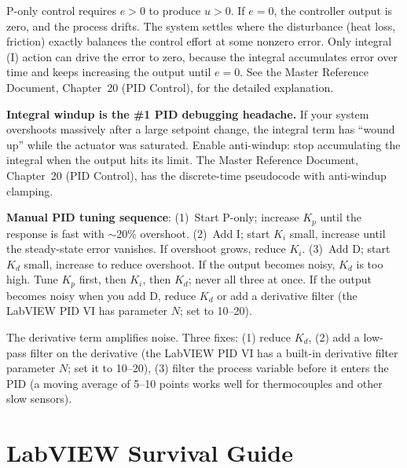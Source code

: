 \documentclass[11pt,letterpaper]{article}
\begin{document}
\begin{faqbox}
P-only control requires $e > 0$ to produce $u > 0$. If $e = 0$, the controller output is zero, and the process drifts. The system settles where the disturbance (heat loss, friction) exactly balances the control effort at some nonzero error. Only integral (I) action can drive the error to zero, because the integral accumulates error over time and keeps increasing the output until $e = 0$. See the Master Reference Document, Chapter~20 (PID Control), for the detailed explanation.
\end{faqbox}

\begin{warnbox}
\textbf{Integral windup is the \#1 PID debugging headache.} If your system overshoots massively after a large setpoint change, the integral term has ``wound up'' while the actuator was saturated. Enable anti-windup: stop accumulating the integral when the output hits its limit. The Master Reference Document, Chapter~20 (PID Control), has the discrete-time pseudocode with anti-windup clamping.
\end{warnbox}

\begin{protip}
\textbf{Manual PID tuning sequence}: (1)~Start P-only; increase $K_p$ until the response is fast with $\sim$20\% overshoot. (2)~Add I; start $K_i$ small, increase until the steady-state error vanishes. If overshoot grows, reduce $K_i$. (3)~Add D; start $K_d$ small, increase to reduce overshoot. If the output becomes noisy, $K_d$ is too high. Tune $K_p$ first, then $K_i$, then $K_d$; never all three at once. If the output becomes noisy when you add D, reduce $K_d$ or add a derivative filter (the LabVIEW PID VI has parameter $N$; set to 10--20).
\end{protip}

\begin{faqbox}
The derivative term amplifies noise. Three fixes: (1) reduce $K_d$, (2) add a low-pass filter on the derivative (the LabVIEW PID VI has a built-in derivative filter parameter $N$; set it to 10--20), (3) filter the process variable before it enters the PID (a moving average of 5--10 points works well for thermocouples and other slow sensors).
\end{faqbox}

\section{LabVIEW Survival Guide}
\end{document}
